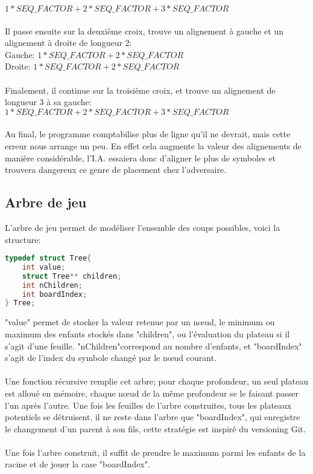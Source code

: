 \documentclass[a4paper, 11pt]{article}
\begin{document}
$1 * SEQ\_FACTOR + 2 * SEQ\_FACTOR + 3 * SEQ\_FACTOR$ \\
\\
Il passe ensuite sur la deuxième croix, trouve un alignement à gauche et un alignement à droite de longueur 2:\\

Gauche: $1 * SEQ\_FACTOR + 2 * SEQ\_FACTOR$\\

Droite: $1 * SEQ\_FACTOR + 2 * SEQ\_FACTOR$\\
\\
Finalement, il continue sur la troisième croix, et trouve un alignement de longueur 3 à sa gauche:\\

$1 * SEQ\_FACTOR + 2 * SEQ\_FACTOR + 3 * SEQ\_FACTOR$ \\
\\
Au final, le programme comptabilise plus de ligne qu'il ne devrait, mais cette erreur nous arrange un peu. En effet cela augmente la valeur des alignements de manière considérable, l'I.A. essaiera donc d'aligner le plus de symboles et trouvera dangereux ce genre de placement chez l'adversaire.

\subsection{Arbre de jeu}

L'arbre de jeu permet de modéliser l'ensemble des coups possibles, voici la structure:

\begin{lstlisting}[language=C]
typedef struct Tree{
    int value;
    struct Tree** children;
    int nChildren;
    int boardIndex;
} Tree;
\end{lstlisting}

"value" permet de stocker la valeur retenue par un nœud, le minimum ou maximum des enfants stockés dans "children", ou l'évaluation du plateau si il s'agit d'une feuille. "nChildren"correspond au nombre d'enfants, et "boardIndex" s'agit de l'index du symbole changé par le nœud courant.\\
\\
Une fonction récursive remplie cet arbre; pour chaque profondeur, un seul plateau est alloué en mémoire, chaque nœud de la même profondeur se le faisant passer l'un après l'autre. Une fois les feuilles de l'arbre construites, tous les plateaux potentiels se détruisent, il ne reste dans l'arbre que "boardIndex", qui enregistre le changement d'un parent à son fils, cette stratégie est inspiré du versioning Git.\\
\\
Une fois l'arbre construit, il suffit de prendre le maximum parmi les enfants de la racine et de jouer la case "boardIndex".
\end{document}
